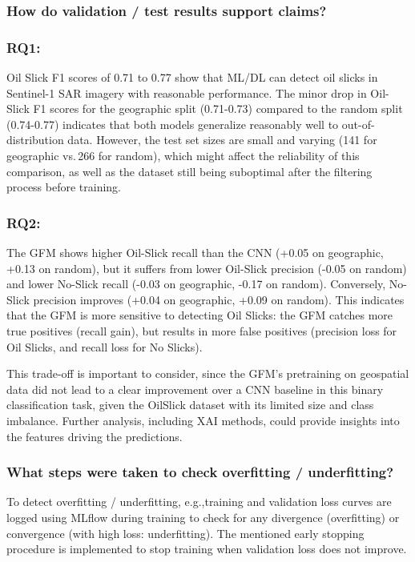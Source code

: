 \documentclass[sigconf]{acmart}
\begin{document}
\subsubsection{How do validation / test results support claims?}

\subsubsection*{\textbf{RQ1:}} Oil Slick F1 scores of 0.71 to 0.77 show that ML/DL can detect oil slicks in Sentinel-1 SAR imagery with reasonable performance. The minor drop in Oil-Slick F1 scores for the geographic split (0.71-0.73) compared to the random split (0.74-0.77) indicates that both models generalize reasonably well to out-of-distribution data. However, the test set sizes are small and varying (141 for geographic vs.\,266 for random), which might affect the reliability of this comparison, as well as the dataset still being suboptimal after the filtering process before training.

\subsubsection*{\textbf{RQ2:}} The GFM shows higher Oil-Slick recall than the CNN (+0.05 on geographic, +0.13 on random), but it suffers from lower Oil-Slick precision (-0.05 on random) and lower No-Slick recall (-0.03 on geographic, -0.17 on random). Conversely, No-Slick precision improves (+0.04 on geographic, +0.09 on random). This indicates that the GFM is more sensitive to detecting Oil Slicks: the GFM catches more true positives (recall gain), but results in more false positives (precision loss for Oil Slicks, and recall loss for No Slicks). 

This trade-off is important to consider, since the GFM's pretraining on geospatial data did not lead to a clear improvement over a CNN baseline in this binary classification task, given the OilSlick dataset with its limited size and class imbalance. Further analysis, including XAI methods, could provide insights into the features driving the predictions.

\subsubsection{What steps were taken to check overfitting / underfitting?} To detect overfitting / underfitting, e.g.,training and validation loss curves are logged using MLflow during training to check for any divergence (overfitting) or convergence (with high loss: underfitting). The mentioned early stopping procedure is implemented to stop training when validation loss does not improve.
\end{document}
